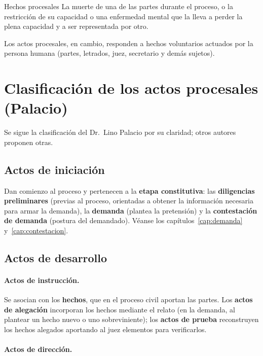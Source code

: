 \documentclass[12pt,oneside]{book}
\begin{document}
\begin{ejemplo}{Hechos procesales}
La muerte de una de las partes durante el proceso, o la restricción de su capacidad o una enfermedad mental que la lleva a perder la plena capacidad y a ser representada por otro.
\end{ejemplo}

Los actos procesales, en cambio, responden a hechos voluntarios actuados por la persona humana (partes, letrados, juez, secretario y demás sujetos).

\section{Clasificación de los actos procesales (Palacio)}

Se sigue la clasificación del Dr.~Lino Palacio por su claridad; otros autores proponen otras.

\subsection{Actos de iniciación}

Dan comienzo al proceso y pertenecen a la \textbf{etapa constitutiva}: las \textbf{diligencias preliminares} (previas al proceso, orientadas a obtener la información necesaria para armar la demanda), la \textbf{demanda} (plantea la pretensión) y la \textbf{contestación de demanda} (postura del demandado). Véanse los capítulos~\ref{cap:demanda} y~\ref{cap:contestacion}.

\subsection{Actos de desarrollo}

\paragraph{Actos de instrucción.} Se asocian con los \textbf{hechos}, que en el proceso civil aportan las partes. Los \textbf{actos de alegación} incorporan los hechos mediante el relato (en la demanda, al plantear un hecho nuevo o uno sobreviniente); los \textbf{actos de prueba} reconstruyen los hechos alegados aportando al juez elementos para verificarlos.

\paragraph{Actos de dirección.}
\end{document}

